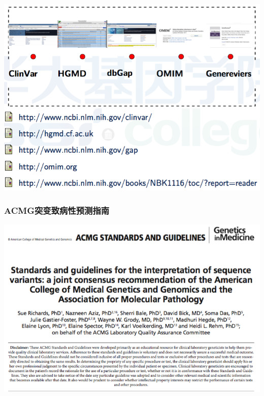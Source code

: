 \documentclass[12pt]{beamer}
\begin{document}
\begin{frame}
  \includegraphics[width=\textwidth]{figures/old_slides/anno4.png}  
\end{frame}

\begin{frame}\frametitle{ACMG突变致病性预测指南}
  \includegraphics[width=\textwidth]{figures/acmg.png}  
\end{frame}
\end{document}
